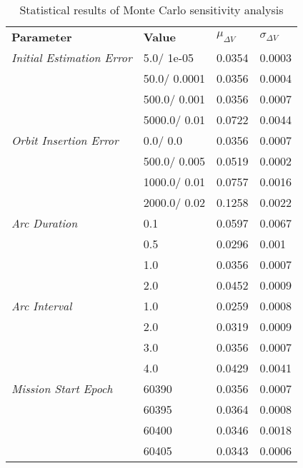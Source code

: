 
                    \begin{table}[]
                    \centering
                    \begin{tabular}{l l l l}
                    \rowcolor[HTML]{EFEFEF} \textbf{Parameter} & \textbf{Value} & \textbf{$\mu_{\Delta V}$} & \textbf{$\sigma_{\Delta V}$} \\
                    \textit{Initial Estimation Error} & 5.0/
1e-05 & 0.0354 & 0.0003 \\
 & 50.0/
0.0001 & 0.0356 & 0.0004 \\
 & 500.0/
0.001 & 0.0356 & 0.0007 \\
 & 5000.0/
0.01 & 0.0722 & 0.0044 \\
\textit{Orbit Insertion Error} & 0.0/
0.0 & 0.0356 & 0.0007 \\
 & 500.0/
0.005 & 0.0519 & 0.0002 \\
 & 1000.0/
0.01 & 0.0757 & 0.0016 \\
 & 2000.0/
0.02 & 0.1258 & 0.0022 \\
\textit{Arc Duration} & 0.1 & 0.0597 & 0.0067 \\
 & 0.5 & 0.0296 & 0.001 \\
 & 1.0 & 0.0356 & 0.0007 \\
 & 2.0 & 0.0452 & 0.0009 \\
\textit{Arc Interval} & 1.0 & 0.0259 & 0.0008 \\
 & 2.0 & 0.0319 & 0.0009 \\
 & 3.0 & 0.0356 & 0.0007 \\
 & 4.0 & 0.0429 & 0.0041 \\
\textit{Mission Start Epoch} & 60390 & 0.0356 & 0.0007 \\
 & 60395 & 0.0364 & 0.0008 \\
 & 60400 & 0.0346 & 0.0018 \\
 & 60405 & 0.0343 & 0.0006 \\

                    \end{tabular}
                    \caption{Statistical results of Monte Carlo sensitivity analysis}
                    \label{tab:SensitivityAnalysis}
                    \end{table}
                    